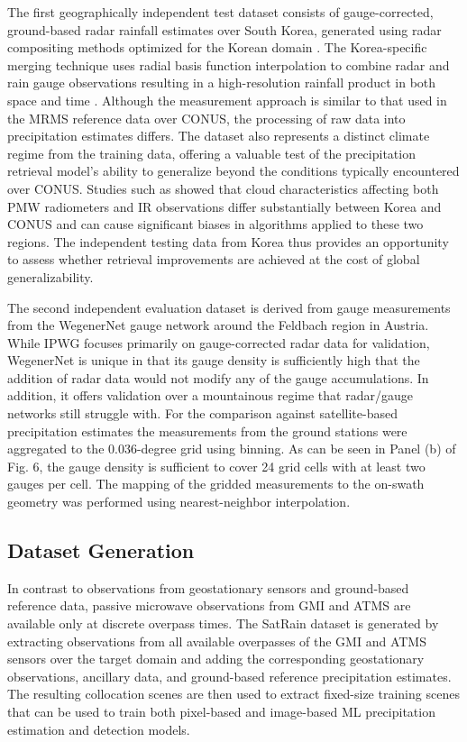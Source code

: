 \documentclass[11pt]{article}
\begin{document}
The first geographically independent test dataset consists of gauge-corrected,
ground-based radar rainfall estimates over South Korea, generated using radar
compositing methods optimized for the Korean domain
\citep{Kwon2015RadarComparison}. The Korea-specific merging technique uses
radial basis function interpolation to combine radar and rain gauge observations
resulting in a high-resolution rainfall product in both space and time \citep{Ryu2025RBFMerging}.
Although the measurement approach is similar to that used in the MRMS reference
data over CONUS, the processing of raw data into precipitation estimates
differs. The dataset also represents a distinct climate regime from the training
data, offering a valuable test of the precipitation retrieval model’s ability to
generalize beyond the conditions typically encountered over CONUS. Studies such
as \cite{Sohn2013WarmRain} showed that cloud characteristics affecting both PMW
radiometers and IR observations differ substantially between Korea and CONUS and
can cause significant biases in algorithms applied to these two regions. The
independent testing data from Korea thus provides an opportunity to assess
whether retrieval improvements are achieved at the cost of global
generalizability.

The second independent evaluation dataset is derived from gauge measurements from the WegenerNet \citep{Fuchsberger2021WegenerNet} gauge network around the Feldbach region in Austria. While IPWG focuses primarily on gauge-corrected radar data for validation, WegenerNet is unique in that its gauge density is sufficiently high that the addition of radar data would not modify any of the gauge accumulations. In addition, it offers validation over a mountainous regime that radar/gauge networks still struggle with. For the comparison against satellite-based precipitation estimates the measurements from the ground stations were aggregated to the 0.036-degree grid using binning. As can be seen in Panel (b) of Fig. 6, the gauge density is sufficient to cover 24 grid cells with at least two gauges per cell. The mapping of the gridded measurements to the on-swath geometry was performed using nearest-neighbor interpolation.


\subsection{Dataset Generation}

In contrast to observations from geostationary sensors and ground-based
reference data, passive microwave observations from GMI and ATMS are available
only at discrete overpass times. The SatRain dataset is generated by extracting
observations from all available overpasses of the GMI and ATMS sensors over the
target domain and adding the corresponding geostationary observations, ancillary
data, and ground-based reference precipitation estimates. The resulting
collocation scenes are then used to extract fixed-size training scenes that can
be used to train both pixel-based and image-based ML precipitation estimation
and detection models.
\end{document}
